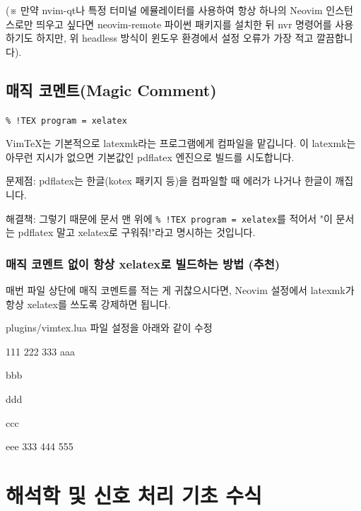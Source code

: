 \documentclass[12pt,a4paper,oneside]{memoir}
\begin{document}
(※ 만약 nvim-qt나 특정 터미널 에뮬레이터를 사용하여 항상 하나의 Neovim 인스턴스로만 띄우고 싶다면 neovim-remote 파이썬 패키지를 설치한 뒤 nvr 명령어를 사용하기도 하지만, 위 headless 방식이 윈도우 환경에서 설정 오류가 가장 적고 깔끔합니다).


\section{매직 코멘트(Magic Comment)}
\verb|% !TEX program = xelatex|

VimTeX는 기본적으로 latexmk라는 프로그램에게 컴파일을 맡깁니다. 이 latexmk는 아무런 지시가 없으면 기본값인 pdflatex 엔진으로 빌드를 시도합니다.

문제점: pdflatex는 한글(kotex 패키지 등)을 컴파일할 때 에러가 나거나 한글이 깨집니다.

해결책: 그렇기 때문에 문서 맨 위에 \verb|% !TEX program = xelatex|를 적어서 "이 문서는 pdflatex 말고 xelatex로 구워줘!"라고 명시하는 것입니다.

\subsection{매직 코멘트 없이 항상 xelatex로 빌드하는 방법 (추천)}

매번 파일 상단에 매직 코멘트를 적는 게 귀찮으시다면, Neovim 설정에서 latexmk가 항상 xelatex를 쓰도록 강제하면 됩니다.

plugins/vimtex.lua 파일 설정을 아래와 같이 수정




111 222 333
aaa

bbb

ddd

ccc

eee
333
444
555








\chapter{해석학 및 신호 처리 기초 수식}
\end{document}
